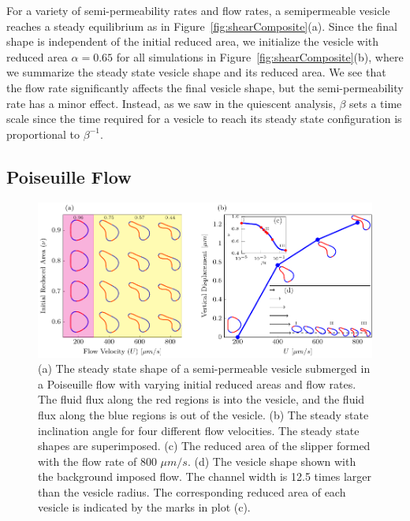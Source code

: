 \documentclass[9pt,twocolumn,twoside,lineno]{pnas-new}
\newif\ifTikz
\begin{document}
For a variety of semi-permeability rates and flow rates, a semipermeable
vesicle reaches a steady equilibrium as in
Figure~\ref{fig:shearComposite}(a).  Since the final shape is
independent of the initial reduced area,  we initialize the vesicle with
reduced area $\alpha = 0.65$ for all simulations in
Figure~\ref{fig:shearComposite}(b), where we summarize the steady state
vesicle shape and its reduced area. We see that the flow rate
significantly affects the final vesicle shape, but the semi-permeability
rate has a minor effect. Instead, as we saw in the quiescent analysis,
$\beta$ sets a time scale since the time required for a vesicle to reach
its steady state configuration is proportional to $\beta^{-1}$.

\subsection*{Poiseuille Flow}
\begin{figure}[htp]
  \ifTikz
  \centering
  
  \else
  \includegraphics{figures/parabolicComposite.pdf}
  \fi
  \caption{\label{fig:parabolicComposite} (a) The steady state shape of
  a semi-permeable vesicle submerged in a Poiseuille flow with varying
  initial reduced areas and flow rates. The fluid flux along the red
  regions is into the vesicle, and the fluid flux along the blue regions
  is out of the vesicle.  (b) The steady state inclination angle for
  four different flow velocities. The steady state shapes are
  superimposed. (c) The reduced area of the slipper formed with the flow
  rate of 800 $\mu m/s$. (d) The vesicle shape shown with the background
  imposed flow. The channel width is 12.5 times larger than the vesicle
  radius. The corresponding reduced area of each vesicle is indicated by
  the marks in plot (c).}
\end{figure}
\end{document}
